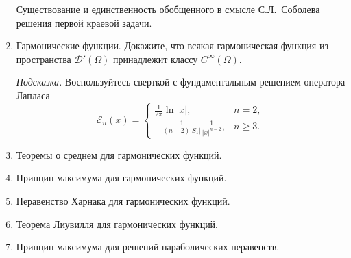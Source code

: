 \documentclass[12pt,a4paper,draft]{article}
\DeclareRobustCommand*{\т}{~--- }
\DeclareRobustCommand*{\ч}{~-- }
\begin{document}
\begin{enumerate}
Существование и единственность обобщенного в смысле С.Л.~Соболева
решения первой краевой задачи.

\item
Гармонические функции. Докажите, что всякая гармоническая функция
из пространства ${\mathcal D}' (\Omega)$ принадлежит классу
$C^\infty (\Omega)$.

{\it Подсказка.} Воспользуйтесь сверткой с фундаментальным
решением оператора Лапласа
$$
    {\mathcal E}_n (x)
    =
    \left\{
        \begin{array}{ll}
            \frac{1}{2 \pi}
            \ln |x|,
            &
            n = 2,
            \\
            - \frac{
                1
            }{
                (n - 2)
                |S_1|
            }
            \frac{
                1
            }{
                |x|^{n - 2}
            },
            &
            n \ge 3.
        \end{array}
    \right.
$$

\item
Теоремы о среднем для гармонических функций.

\item
Принцип максимума для гармонических функций.

\item
Неравенство Харнака для гармонических функций.

\item
Теорема Лиувилля для гармонических функций.

\item
Принцип максимума для решений параболических неравенств.

\end{enumerate}
\end{document}
